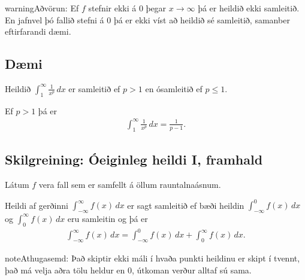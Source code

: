 \documentclass[b5paper,10pt,icelandic]{sphinxmanual}
\begin{document}
\begin{sphinxadmonition}{warning}{Aðvörun:}
Ef \(f\) stefnir ekki á 0 þegar \(x\to \infty\) þá
er heildið ekki samleitið. En jafnvel þó fallið stefni á
0 þá er ekki víst að heildið sé samleitið, samanber
eftirfarandi dæmi.
\end{sphinxadmonition}


\subsection{Dæmi}
\label{\detokenize{kafli06:daemi}}
Heildið \(\int_1^\infty \frac{1}{x^p}\,dx\) er samleitið ef
\(p>1\) en ósamleitið ef \(p\leq 1\).

Ef \(p>1\) þá er
\begin{equation*}
\begin{split}\int_1^\infty \frac{1}{x^p}\,dx=\frac{1}{p-1}.\end{split}
\end{equation*}

\subsection{Skilgreining: Óeiginleg heildi I, framhald}
\label{\detokenize{kafli06:skilgreining-oeiginleg-heildi-i-framhald}}
Látum \(f\) vera fall sem er samfellt á öllum rauntalnaásnum.

Heildi af gerðinni \(\int_{-\infty}^\infty f(x)\,dx\) er sagt
samleitið ef bæði heildin \(\int_{-\infty}^0 f(x)\,dx\) og
\(\int_0^\infty f(x)\,dx\) eru samleitin og þá er
\begin{equation*}
\begin{split}\int_{-\infty}^\infty f(x)\,dx=\int_{-\infty}^0 f(x)\,dx +
  \int_0^\infty f(x)\,dx.\end{split}
\end{equation*}
\begin{sphinxadmonition}{note}{Athugasemd:}
Það skiptir ekki máli í hvaða punkti heildinu er skipt í tvennt, það má
velja aðra tölu heldur en 0, útkoman verður alltaf sú sama.
\end{sphinxadmonition}
\end{document}

